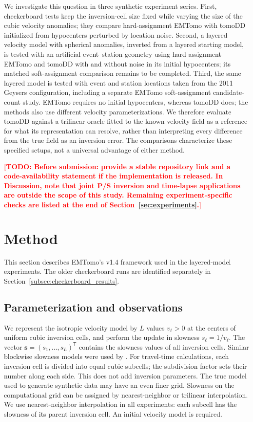 \documentclass[12pt, a4paper]{article}
\newcommand{\todo}[1]{\textcolor{red}{\textbf{[TODO: #1]}}}
\begin{document}
We investigate this question in three synthetic experiment series. First, checkerboard tests keep the inversion-cell size fixed while varying the size of the cubic velocity anomalies; they compare hard-assignment EMTomo with tomoDD initialized from hypocenters perturbed by location noise. Second, a layered velocity model with spherical anomalies, inverted from a layered starting model, is tested with an artificial event--station geometry using hard-assignment EMTomo and tomoDD with and without noise in its initial hypocenters; its matched soft-assignment comparison remains to be completed. Third, the same layered model is tested with event and station locations taken from the 2011 Geysers configuration, including a separate EMTomo soft-assignment candidate-count study. EMTomo requires no initial hypocenters, whereas tomoDD does; the methods also use different velocity parameterizations. We therefore evaluate tomoDD against a trilinear oracle fitted to the known velocity field as a reference for what its representation can resolve, rather than interpreting every difference from the true field as an inversion error. The comparisons characterize these specified setups, not a universal advantage of either method.

\todo{Before submission: provide a stable repository link and a code-availability statement if the implementation is released. In Discussion, note that joint P/S inversion and time-lapse applications are outside the scope of this study. Remaining experiment-specific checks are listed at the end of Section~\ref{sec:experiments}.}

\section{Method}
\label{sec:method}

This section describes EMTomo's v1.4 framework used in the layered-model experiments. The older checkerboard runs are identified separately in Section~\ref{subsec:checkerboard_results}.

\subsection{Parameterization and observations}
\label{subsec:parameterization}

We represent the isotropic velocity model by $L$ values $v_\ell>0$ at the centers of uniform cubic inversion cells, and perform the update in slowness $s_\ell=1/v_\ell$. The vector $\mathbf{s}=(s_1,\ldots,s_L)^{\mathsf T}$ contains the slowness values of all inversion cells. Similar blockwise slowness models were used by \textcite{aki1976}. For travel-time calculations, each inversion cell is divided into equal cubic subcells; the subdivision factor sets their number along each side. This does not add inversion parameters. The true model used to generate synthetic data may have an even finer grid. Slowness on the computational grid can be assigned by nearest-neighbor or trilinear interpolation. We use nearest-neighbor interpolation in all experiments: each subcell has the slowness of its parent inversion cell. An initial velocity model is required.
\end{document}
